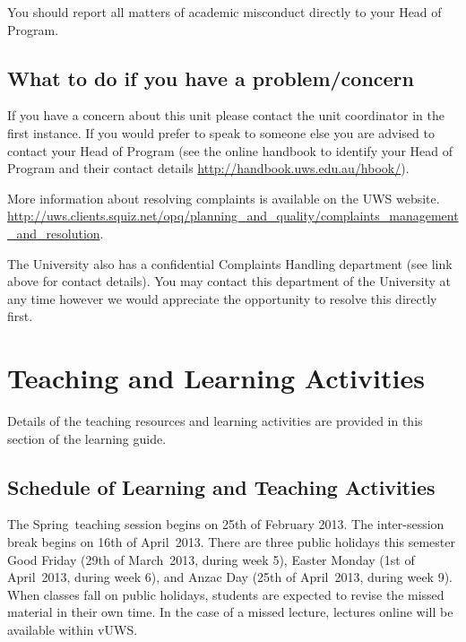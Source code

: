 \documentclass[a4paper,oneside]{book}
\newcommand{\vuws}{vUWS}
\newcommand{\teachingsession}{Spring}
\newcommand{\teachingsessiondate}{25th of February}
\newcommand{\teachingyear}{2013}
\newcommand{\intersessionbreak}{16th of April}
\newcommand{\goodfridaydate}{29th of March}
\newcommand{\goodfridayweek}{5}
\newcommand{\eastermondaydate}{1st of April}
\newcommand{\eastermondayweek}{6}
\newcommand{\anzacdaydate}{25th of April}
\newcommand{\anzacdayweek}{9}
\newcommand{\publicholidays}{
There are three public holidays
this semester Good Friday (\goodfridaydate~\teachingyear, during week
\goodfridayweek), Easter Monday (\eastermondaydate~\teachingyear,
during week \eastermondayweek), and Anzac Day
(\anzacdaydate~\teachingyear, during week \anzacdayweek).}
\begin{document}
You should report all matters of academic misconduct directly to your
Head of Program.

\section{What to do if you have a problem/concern}

If you have a concern about this unit please contact the unit
coordinator in the first instance.  If you would prefer to speak to
someone else you are advised to contact your Head of Program (see the
online handbook to identify your Head of Program and their contact
details \url{http://handbook.uws.edu.au/hbook/}).

More information about resolving complaints is available on the UWS
website. \url{http://uws.clients.squiz.net/opq/planning_and_quality/complaints_management_and_resolution}.

The University also has a confidential Complaints Handling department
(see link above for contact details).  You may contact this department
of the University at any time however we would appreciate the
opportunity to resolve this directly first.




\chapter{Teaching and Learning Activities}

Details of the teaching resources and learning activities are provided
in this section of the learning guide.


\section{Schedule of Learning and Teaching Activities}
The \teachingsession~teaching session begins on \teachingsessiondate
\teachingyear.  The inter-session break begins on
\intersessionbreak~\teachingyear.  \publicholidays~
When classes
fall on public holidays, students are expected to revise the missed
material in their own time. In the case of a missed lecture, lectures
online will be available within \vuws.
\end{document}
